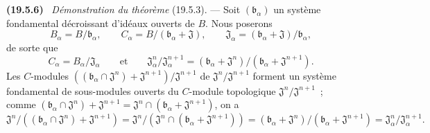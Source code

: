 \documentclass[10pt,oneside]{book}
\makeatletter
\newcommand{\setmanualcurrentlabel}[1]{\def\@currentlabel{#1}}
\newenvironment{env}[1][]{\setmanualcurrentlabel{#1}\par\medskip\noindent\textbf{(#1)}\ }{\par}
\makeatother
\begin{document}
\begin{env}[19.5.6]
\label{0.19.5.6-fr}
\emph{Démonstration du théorème} (19.5.3). --- Soit
$(\mathfrak b_\alpha)$ un système fondamental décroissant d'idéaux ouverts de
$B$. Nous poserons
\[
  B_\alpha=B/\mathfrak b_\alpha,\qquad
  C_\alpha=B/(\mathfrak b_\alpha+\mathfrak J),\qquad
  \mathfrak J_\alpha=(\mathfrak b_\alpha+\mathfrak J)/\mathfrak b_\alpha,
\]
de sorte que
\[
  C_\alpha=B_\alpha/\mathfrak J_\alpha\qquad\text{et}\qquad
  \mathfrak J_\alpha^n/\mathfrak J_\alpha^{n+1}
  =(\mathfrak b_\alpha+\mathfrak J^n)/(\mathfrak b_\alpha+\mathfrak J^{n+1}).
\]
Les $C$-modules
$((\mathfrak b_\alpha\cap\mathfrak J^n)+\mathfrak J^{n+1})/
\mathfrak J^{n+1}$ de $\mathfrak J^n/\mathfrak J^{n+1}$ forment un système
fondamental de sous-modules ouverts du $C$-module topologique
$\mathfrak J^n/\mathfrak J^{n+1}$~; comme
$(\mathfrak b_\alpha\cap\mathfrak J^n)+\mathfrak J^{n+1}
=\mathfrak J^n\cap(\mathfrak b_\alpha+\mathfrak J^{n+1})$, on a
\[
  \mathfrak J^n/((\mathfrak b_\alpha\cap\mathfrak J^n)+\mathfrak J^{n+1})
  =\mathfrak J^n/(\mathfrak J^n\cap(\mathfrak b_\alpha+\mathfrak J^{n+1}))
  =(\mathfrak b_\alpha+\mathfrak J^n)/(\mathfrak b_\alpha+\mathfrak J^{n+1})
  =\mathfrak J_\alpha^n/\mathfrak J_\alpha^{n+1}.
\]
\end{env}
\end{document}
